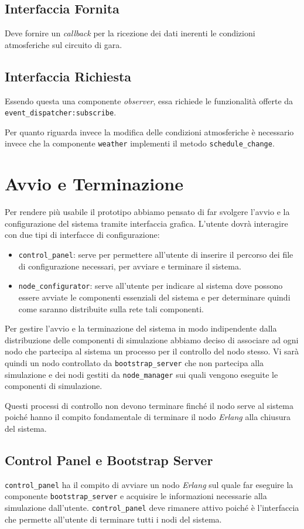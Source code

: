 \documentclass[11pt,a4paper]{report}
\newcommand{\Erlang}{\textsl{Erlang}}
\newcommand{\fun}[1]{\texttt{#1}}
\begin{document}
\subsection*{Interfaccia Fornita}
Deve fornire un \textit{callback} per la ricezione dei dati inerenti le condizioni atmosferiche sul circuito di gara.
\subsection*{Interfaccia Richiesta}
Essendo questa una componente \textit{observer}, essa richiede le funzionalità offerte da \fun{event\_dispatcher:subscribe}.

Per quanto riguarda invece la modifica delle condizioni atmosferiche è necessario invece che la componente \texttt{weather} implementi il metodo \fun{schedule\_change}.

\section{Avvio e Terminazione}
Per rendere più usabile il prototipo abbiamo pensato di far svolgere l'avvio e la configurazione del sistema tramite interfaccia grafica.
L'utente dovrà interagire con due tipi di interfacce di configurazione:
\begin{itemize}
\item \texttt{control\_panel}: serve per permettere all'utente di inserire il percorso dei file di configurazione necessari, per avviare e terminare il sistema.
\item \texttt{node\_configurator}: serve all'utente per indicare al sistema dove possono essere avviate le componenti essenziali del sistema e per determinare quindi come saranno distribuite sulla rete tali componenti.
\end{itemize}
Per gestire l'avvio e la terminazione del sistema in modo indipendente dalla distribuzione delle componenti di simulazione abbiamo deciso di associare ad ogni nodo che partecipa al sistema un processo per il controllo del nodo stesso. Vi sarà quindi un nodo controllato da \texttt{bootstrap\_server} che non partecipa alla simulazione e dei nodi gestiti da \texttt{node\_manager} sui quali vengono eseguite le componenti di simulazione.

Questi processi di controllo non devono terminare finché il nodo serve al sistema poiché hanno il compito fondamentale di terminare il nodo \Erlang{} alla chiusura del sistema.

\subsection*{Control Panel e Bootstrap Server}
\texttt{control\_panel} ha il compito di avviare un nodo \Erlang{} sul quale far eseguire la componente \texttt{bootstrap\_server} e acquisire le informazioni necessarie alla simulazione dall'utente.
\texttt{control\_panel} deve rimanere attivo poiché è l'interfaccia che permette all'utente di terminare tutti i nodi del sistema.
\end{document}
